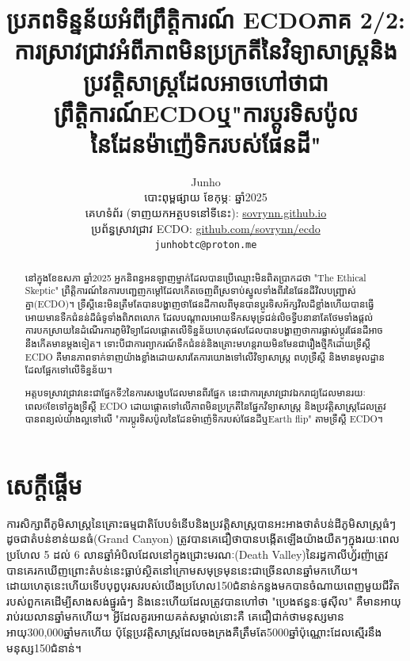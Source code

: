 \documentclass[10pt,twocolumn,letterpaper]{article}
\begin{document}
\title{ប្រភពទិន្នន័យអំពីព្រឹត្តិការណ៍ ECDOភាគ 2/2: ការស្រាវជ្រាវអំពីភាពមិនប្រក្រតីនៃវិទ្យាសាស្ត្រនិងប្រវត្តិសាស្ត្រដែលអាចហៅថាជាព្រឹត្តិការណ៍ECDOឬ​"ការប្តូរទិសប៉ូលនៃដែនម៉ាញ៉េទិករបស់ផែនដី"}

\author{Junho\\
បោះពុម្ពផ្សាយ ខែកុម្ភៈ ឆ្នាំ2025\\
គេហទំព័រ (ទាញយកអត្ថបទនៅទីនេះ): \href{https://sovrynn.github.io}{sovrynn.github.io}\\
ប្រព័ន្ធស្រាវជ្រាវ ECDO: \href{https://github.com/sovrynn/ecdo}{github.com/sovrynn/ecdo}\\
{\tt\small junhobtc@proton.me}
}

\maketitle

\begin{abstract}
នៅក្នុងខែឧសភា ឆ្នាំ2025 អ្នកនិពន្ធអនឡាញម្នាក់ដែលបានប្រើឈ្មោះមិនពិតប្រាកដថា "The Ethical Skeptic"\cite{0} ព្រឹត្តិការណ៍នៃការបញ្ជេញកម្តៅដែលកើតចេញពីស្រទាប់ស្នូលទាំងពីរនៃផែនដីវិលបញ្ជ្រាស់គ្នា(ECDO)\cite{1}។ ទ្រឹស្ដីនេះមិនត្រឹមតែបានបង្ហាញថាផែនដីកាលពីមុនបានប្តូរទិសអ័ក្សវិលដ៏ខ្លាំងហើយបានធ្វើអោយមានទឹកជំនន់ដ៏ធំទូទាំងពិភពលោក ដែលបណ្តាលអោយទឹកសមុទ្រជន់លិចទ្វីបនានា​តែថែមទាំងផ្ដល់ការបកស្រាយនៃដំណើរការភូមិវិទ្យាដែលផ្តោតលើទិន្នន័យហេតុផលដែលបានបង្ហាញថាការផ្លាស់ប្តូរផែនដីអាចនឹងកើតមានម្តងទៀត។ ទោះបីជាការព្យាករណ៍ទឹកជំនន់និងគ្រោះមហន្តរាយមិនមែនជារឿងថ្មីក៏ដោយទ្រឹស្តី ECDO គឺមានភាពទាក់ទាញយ៉ាងខ្លាំងដោយសារតែការយោងទៅលើវិទ្យាសាស្ត្រ ពហុទ្រឹស្តី និងមានមូលដ្ឋានដែលផ្អែកទៅលើទិន្នន័យ។

អត្តបទស្រាវជ្រាវនេះជាផ្នែកទី2នៃការសង្ខេបដែលមានពីរផ្នែក នេះជាការស្រាវជ្រាវឯករាជ្យដែលមានរយៈពេល6ខែ\cite{2,20}​ទៅក្នុងទ្រឹស្ដី ECDO ដោយផ្តោតទៅលើភាពមិនប្រក្រតីនៃផ្នែកវិទ្យាសាស្ត្រ និងប្រវត្តិសាស្ត្រដែលត្រូវបានពន្យល់យ៉ាងល្អទៅលើ "ការប្តូរទិសប៉ូលនៃដែនម៉ាញ៉េទិករបស់ផែនដី​ឬ​Earth flip" តាមទ្រឹស្ដី ECDO។

\end{abstract}

\section{សេក្តីផ្តើម}

ការសិក្សាពីភូមិសាស្ត្រនៃគ្រោះធម្មជាតិបែបទំនើប​និងប្រវត្តិសាស្ត្របានអះអាងថា​តំបន់ដីភូមិសាស្ត្រធំៗដូចជាតំបន់ខាន់យនធំ(Grand Canyon) ត្រូវបានគេជឿថាបានបង្កើតឡើងយ៉ាងយឺតៗក្នុងរយៈពេលប្រហែល 5 ដល់ 6 លានឆ្នាំ\cite{143}អំបិលដែលនៅក្នុងជ្រោះមរណៈ(Death Valley)នៃរដ្ធកាលីហ្វ័រញ៉ាត្រូវបានគេរកឃើញ​ព្រោះតំបន់នេះធ្លាប់ស្ថិតនៅក្រោមសមុទ្រមុននេះជាច្រើនលានឆ្នាំមកហើយ។ \cite{144} ដោយហេតុនេះហើយទើបបុព្វបុរសរបស់យើងប្រហែល150ជំនាន់កន្លងមកបានចំណាយពេញមួយជីវិតរបស់ពួកគេដើម្បីសាងសង់ផ្នូរធំៗ\cite{29,70} និងនេះហើយដែលត្រូវបានហៅថា "ប្រេងឥន្ធនៈផូសុីល" គឺមានអាយុរាប់រយលានឆ្នាំមកហើយ\cite{104}។ អ្វីដែលគួរអោយគត់សម្គាល់នោះគឺ គេជឿជាក់ថាមនុស្សមានអាយុ300,000ឆ្នាំមកហើយ\cite{145} ប៉ុន្តែប្រវត្តិសាស្ត្រដែលចងក្រងគឺត្រឹមតែ5000ឆ្នាំប៉ុណ្ណោះដែលស្មើរនឹងមនុស្ស150ជំនាន់។
\end{document}
